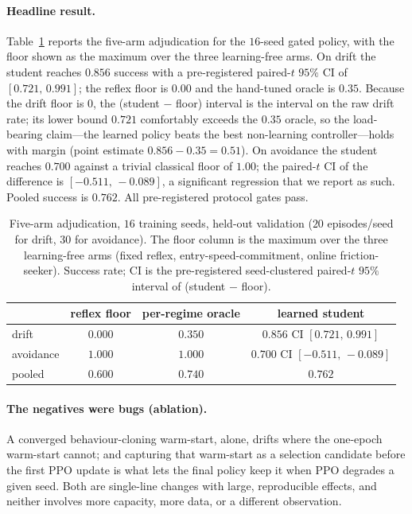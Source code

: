 \documentclass[11pt]{article}
\begin{document}
\paragraph{Headline result.}
Table~\ref{tab:main} reports the five-arm adjudication for the $16$-seed gated policy, with the floor
shown as the maximum over the three learning-free arms. On drift the student reaches $0.856$ success
with a pre-registered paired-$t$ $95\%$ CI of $[0.721,\,0.991]$; the reflex floor is $0.00$ and the
hand-tuned oracle is $0.35$. Because the drift floor is $0$, the (student $-$ floor) interval is the
interval on the raw drift rate; its lower bound $0.721$ comfortably exceeds the $0.35$ oracle, so the
load-bearing claim---the learned policy beats the best non-learning controller---holds with margin
(point estimate $0.856 - 0.35 = 0.51$). On avoidance the student reaches $0.700$ against a trivial
classical floor of $1.00$; the paired-$t$ CI of the difference is $[-0.511,\,-0.089]$, a significant
regression that we report as such. Pooled success is $0.762$. All pre-registered protocol gates pass.

\begin{table}[t]
\centering
\caption{Five-arm adjudication, $16$ training seeds, held-out validation ($20$ episodes/seed for
drift, $30$ for avoidance). The floor column is the maximum over the three learning-free arms
(fixed reflex, entry-speed-commitment, online friction-seeker). Success rate; CI is the
pre-registered seed-clustered paired-$t$ $95\%$ interval of (student $-$ floor).}
\label{tab:main}
\begin{tabular}{lccc}
\toprule
 & reflex floor & per-regime oracle & \textbf{learned student} \\
\midrule
drift     & $0.000$ & $0.350$ & $\mathbf{0.856}$ \quad CI $[0.721,\,0.991]$ \\
avoidance & $1.000$ & $1.000$ & $0.700$ \quad CI $[-0.511,\,-0.089]$ \\
pooled    & $0.600$ & $0.740$ & $0.762$ \\
\bottomrule
\end{tabular}
\end{table}

\paragraph{The negatives were bugs (ablation).}
A converged behaviour-cloning warm-start, alone, drifts where the one-epoch warm-start cannot; and
capturing that warm-start as a selection candidate before the first PPO update is what lets the
final policy keep it when PPO degrades a given seed. Both are single-line changes with large,
reproducible effects, and neither involves more capacity, more data, or a different observation.
\end{document}
